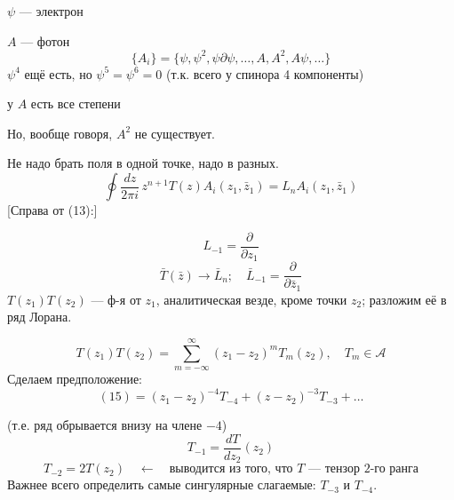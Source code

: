 $\psi$ — электрон

$A$ — фотон
\begin{equation*}
\{A_i\}=\{\psi,\psi^2,\psi\partial\psi,\ldots,A,A^2,A\psi,\ldots\}
\end{equation*}
$\psi^4$ ещё есть, но $\psi^5=\psi^6=0$ (т.к. всего у спинора 4 компоненты)

у $A$ есть все степени

Но, вообще говоря, $A^2$ не существует.

Не надо брать поля в одной точке, надо в разных.
\begin{equation*}
\oint\frac{dz}{2\pi i}\,z^{n+1}T(z)A_i(z_1,\bar z_1)
=L_nA_i(z_1,\bar z_1)
\tag{13}
\end{equation*}
[Справа от (13):]
\begin{center}
\end{center}
\begin{equation*}
L_{-1}=\frac{\partial}{\partial z_1}
\end{equation*}
\begin{equation*}
\bar T(\bar z)\to\bar L_n;\quad
\bar L_{-1}=\frac{\partial}{\partial\bar z_1}
\tag{14}
\end{equation*}
$T(z_1)T(z_2)$ — ф-я от $z_1$, аналитическая везде, кроме точки $z_2$;
разложим её в ряд Лорана.


\begin{equation*}
T(z_1)T(z_2)=\sum_{m=-\infty}^{\infty}(z_1-z_2)^m T_m(z_2),\quad T_m\in\mathcal A
\tag{15}
\end{equation*}
Сделаем предположение:
\begin{equation*}
(15)=(z_1-z_2)^{-4}T_{-4}+(z-z_2)^{-3}T_{-3}+\ldots
\tag{16}
\end{equation*}

(т.е. ряд обрывается внизу на члене $-4$)
\begin{equation*}
T_{-1}=\frac{dT}{dz_2}(z_2)
\tag{17}
\end{equation*}
\begin{equation*}
T_{-2}=2T(z_2)\quad\leftarrow\quad
\text{выводится из того, что $T$ — тензор 2-го ранга}
\tag{18}
\end{equation*}
Важнее всего определить самые сингулярные слагаемые: $T_{-3}$ и $T_{-4}$.

